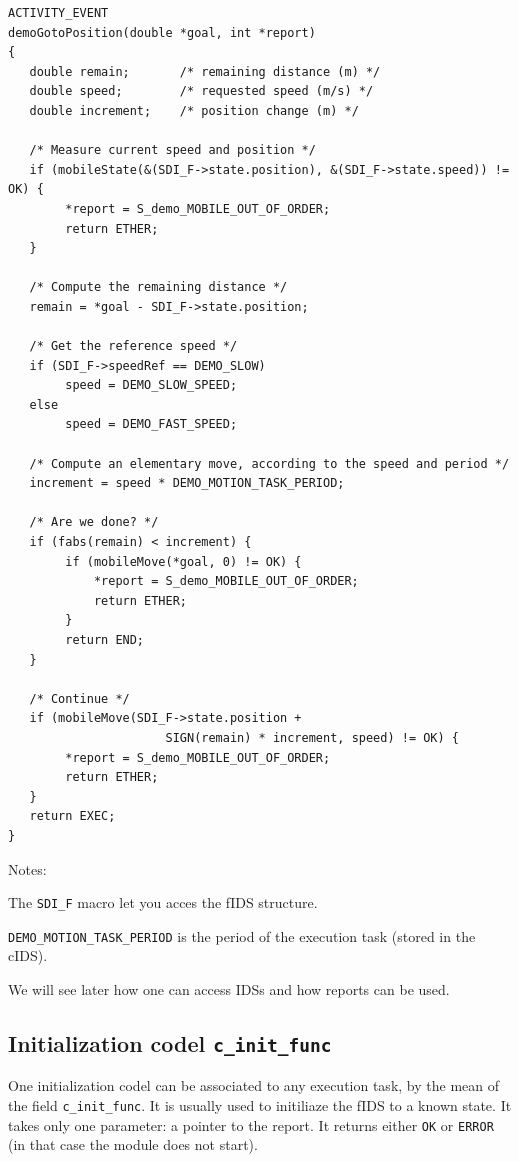 \begin{center}\begin{cartouche}\small\begin{verbatim}
ACTIVITY_EVENT
demoGotoPosition(double *goal, int *report)
{
   double remain;       /* remaining distance (m) */
   double speed;        /* requested speed (m/s) */
   double increment;    /* position change (m) */

   /* Measure current speed and position */
   if (mobileState(&(SDI_F->state.position), &(SDI_F->state.speed)) != OK) {
        *report = S_demo_MOBILE_OUT_OF_ORDER;
        return ETHER;
   }

   /* Compute the remaining distance */
   remain = *goal - SDI_F->state.position;

   /* Get the reference speed */
   if (SDI_F->speedRef == DEMO_SLOW) 
        speed = DEMO_SLOW_SPEED;
   else
        speed = DEMO_FAST_SPEED;

   /* Compute an elementary move, according to the speed and period */
   increment = speed * DEMO_MOTION_TASK_PERIOD;

   /* Are we done? */
   if (fabs(remain) < increment) {
        if (mobileMove(*goal, 0) != OK) {
            *report = S_demo_MOBILE_OUT_OF_ORDER;
            return ETHER;
        }
        return END;
   }

   /* Continue */
   if (mobileMove(SDI_F->state.position +
                      SIGN(remain) * increment, speed) != OK) {
        *report = S_demo_MOBILE_OUT_OF_ORDER;
        return ETHER;
   }
   return EXEC;
}
\end{verbatim}\end{cartouche}\end{center}

Notes:

The {\tt SDI\_F} macro let you acces the fIDS structure.

{\tt DEMO\_MOTION\_TASK\_PERIOD} is the period of the execution task
(stored in the cIDS).

We will see later how one can access IDSs and how reports can be used.


\subsection{Initialization codel {\tt c\_init\_func}}

One initialization codel can be associated to any  execution task, by the
mean of the field {\tt  c\_init\_func}. It is  usually used to initiliaze
the fIDS to a known state. It takes only one  parameter: a pointer to the
report.   It returns either {\tt  OK}  or {\tt ERROR}  (in  that case the
module does not start).

